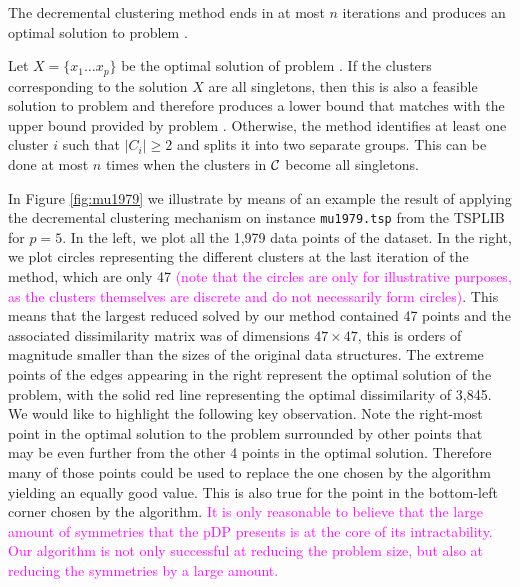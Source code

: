 \documentclass[ijoo,nonblindrev]{informs-ijoo}
\begin{document}
\begin{proposition}\label{proposition:prop1}
	The decremental clustering method ends in at most $n$ iterations and produces an optimal solution to problem .
\end{proposition}
	Let $X = \{x_1\ldots x_p\}$ be the optimal solution of problem . If the clusters corresponding to the solution $X$ are all singletons, then this is also a feasible solution to problem  and therefore produces a lower bound that matches with the upper bound provided by problem . Otherwise, the method identifies at least one cluster $i$ such that $|C_i| \geq 2$ and splits it into two separate groups. This can be done at most $n$ times when the clusters in $\mathcal{C}$ become all singletons.\Halmos
\endproof

In Figure \ref{fig:mu1979} we illustrate by means of an example the result of applying the decremental clustering mechanism on instance \texttt{mu1979.tsp} from the TSPLIB for $p = 5$. In the left, we plot all the 1,979 data points of the dataset. In the right, we plot circles representing the different clusters at the last iteration of the method, which are only 47 \textcolor{magenta}{(note that the circles are only for illustrative purposes, as the clusters themselves are discrete and do not necessarily form circles)}. This means that the largest reduced \pDP{} solved by our method contained 47 points and the associated dissimilarity matrix was of dimensions $47\times 47$, this is orders of magnitude smaller than the sizes of the original data structures. The extreme points of the edges appearing in the right represent the optimal solution of the problem, with the solid red line representing the optimal dissimilarity of 3,845. We would like to highlight the following key observation. Note the right-most point in the optimal solution to the problem surrounded by other points that may be even further from the other 4 points in the optimal solution. Therefore many of those points could be used to replace the one chosen by the algorithm yielding an equally good value. This is also true for the point in the bottom-left corner chosen by the algorithm. \textcolor{magenta}{It is only reasonable to believe that the large amount of symmetries that the pDP presents is at the core of its intractability. Our algorithm is not only successful at reducing the problem size, but also at reducing the symmetries by a large amount.}
\end{document}
